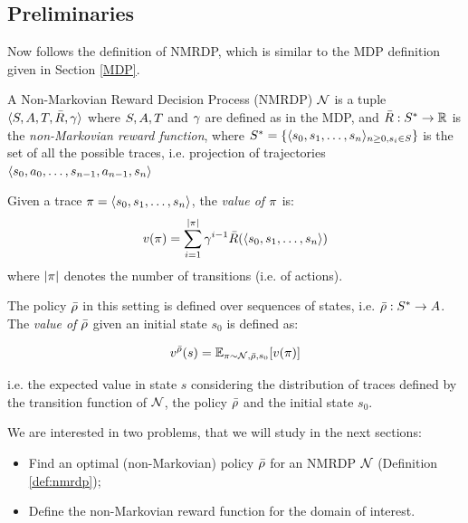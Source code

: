 \subsection{Preliminaries}
Now follows the definition of NMRDP, which is similar to the MDP definition given in Section \ref{MDP}.

\begin{definition}\label{def:nmrdp}
	A Non-Markovian Reward Decision Process (NMRDP) \citep{bacchus1996rewarding} $\mathcal{N}$ is a tuple $\langle S, A, T, \bar{R}, \gamma \rangle$ where $S, A, T$ and $\gamma$ are defined as in the MDP, and $\bar{R} : S^* \to \mathbb{R}$ is the \emph{non-Markovian reward function}, where $S^* = \{\langle s_0, s_1, \dots, s_n \rangle_{n\ge0, s_i\in S}\}$ is the set of all the possible traces, i.e. projection of trajectories $\langle s_0, a_0, \dots, s_{n-1}, a_{n-1}, s_n \rangle$
	
\end{definition}

Given a trace $\pi = \langle s_0, s_1, \dots, s_n \rangle$, the \emph{value of $\pi$} is:
\begin{equation}
v(\pi) = \sum_{i=1}^{|\pi|} \gamma^{i-1}\bar{R}(\langle s_0, s_1, \dots, s_n \rangle)
\end{equation}
where $|\pi|$ denotes the number of transitions (i.e. of actions).

The policy $\bar{\rho}$ in this setting is defined over sequences of states, i.e. $\bar{\rho}: S^* \to A$. The \emph{value of $\bar{\rho}$} given an initial state $s_0$ is defined as:

\begin{equation}
v^{\bar{\rho}}(s) = \mathbb{E}_{\pi \sim \mathcal{N}, \bar{\rho}, s_0}[v(\pi)]
\end{equation}

i.e. the expected value in state $s$ considering the distribution of traces defined by the transition function of $\mathcal{N}$, the policy $\bar{\rho}$ and the initial state $s_0$.

We are interested in two problems, that we will study in the next sections:
\begin{itemize}
	\item Find an optimal (non-Markovian) policy $\bar{\rho}$ for an NMRDP $\mathcal{N}$ (Definition \ref{def:nmrdp});
	\item Define the non-Markovian reward function for the domain of interest.
\end{itemize}

